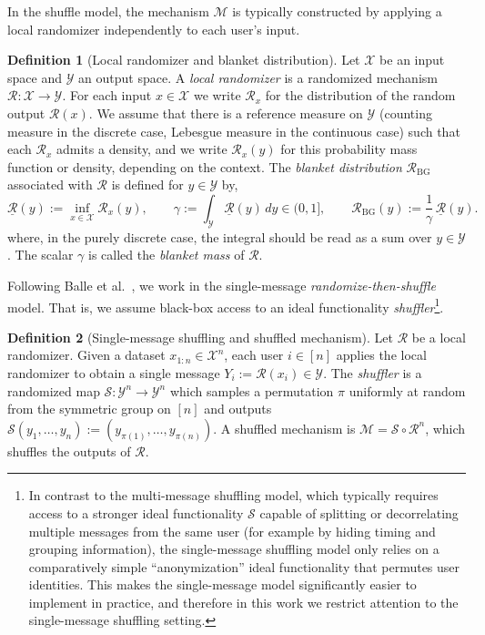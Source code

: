 \documentclass{article}
\theoremstyle{plain}
\theoremstyle{definition}
\newtheorem{definition}{Definition}[section]
\begin{document}
In the shuffle model, the mechanism $\mathcal M$ is typically constructed by applying a local randomizer independently to each user's input.

\begin{definition}[Local randomizer and blanket distribution]
Let $\mathcal X$ be an input space and $\mathcal Y$ an output space.
A \emph{local randomizer} is a randomized mechanism
$
  \mathcal R : \mathcal X \to \mathcal Y.
$
For each input $x\in\mathcal X$ we write $\mathcal R_x$ for the
distribution of the random output $\mathcal R(x)$.
We assume that there is a reference measure on $\mathcal Y$ (counting
measure in the discrete case, Lebesgue measure in the continuous case)
such that each $\mathcal R_x$ admits a density, and we write
$
  \mathcal R_x(y)
$
for this probability mass function or density, depending on the context. The \emph{blanket distribution} $\mathcal R_{\mathrm{BG}}$ associated
with $\mathcal R$ is defined for $y\in\mathcal Y$ by,
\[
  \underline{\mathcal R}(y)
  := \inf_{x\in\mathcal X} \mathcal R_x(y),\qquad
  \gamma
  := \int_{\mathcal Y} \underline{\mathcal R}(y)\,dy \in (0,1],
  \qquad\mathcal R_{\mathrm{BG}}(y)
  := \frac{1}{\gamma}\,\underline{\mathcal R}(y).
\]
where, in the purely discrete case, the integral should be read as a sum
over $y\in\mathcal Y$.
The scalar $\gamma$ is called the \emph{blanket mass} of $\mathcal R$.
\end{definition}



Following Balle et al.~\cite{ballePrivacyBlanketShuffle2019}, we work in the
single-message \emph{randomize-then-shuffle} model.%
That is, we assume black-box access to an ideal functionality \emph{shuffler}\footnote{In contrast to the multi-message shuffling model, which typically
requires access to a stronger ideal functionality $\mathcal S$ capable of
splitting or decorrelating multiple messages from the same user (for example
by hiding timing and grouping information), the single-message shuffling model
only relies on a comparatively simple ``anonymization'' ideal functionality
that permutes user identities. This makes the single-message model
significantly easier to implement in practice, and therefore in this work we
restrict attention to the single-message shuffling setting.}.

\begin{definition}[Single-message shuffling and shuffled mechanism]

\label{def:single-message-shuffle}
Let $\mathcal R$ be a local randomizer. Given a dataset $x_{1:n}\in\mathcal X^n$, each user $i\in[n]$ applies the
local randomizer to obtain a single message
$
  Y_i := \mathcal R(x_i)\in\mathcal Y.
$
The \emph{shuffler} is a randomized map
$
  \mathcal S:\mathcal Y^n\to\mathcal Y^n
$
which samples a permutation $\pi$ uniformly at random from the symmetric
group on $[n]$ and outputs
$
  \mathcal S(y_1,\dots,y_n)
  := (y_{\pi(1)},\dots,y_{\pi(n)}).
$
A shuffled mechanism is $\mathcal{M}=\mathcal{S} \circ \mathcal{R}^n$, which shuffles the outputs of $\mathcal{R}$.
\end{definition}
\end{document}
